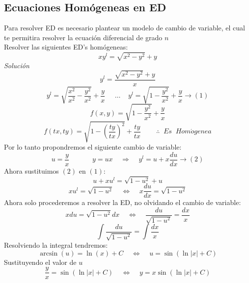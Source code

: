 \documentclass[10pt,executivepaper]{article}
\begin{document}
\subsection{Ecuaciones Homógeneas en ED}
Para resolver ED es necesario plantear un modelo de cambio de variable, el cual te permitira resolver la ecuación diferencial de grado $n$\\
Resolver las siguientes ED's homógeneas:
\[xy^{l}=\sqrt{x^{2}-y^{2}}+y\]
\textit{Solución}
\[y^{l}=\frac{\sqrt{x^{2}-y^{2}}+y}{x}\]
\[y^{l}=\sqrt{\frac{x^{2}}{x^{2}}-\frac{y^{2}}{x^{2}}}+\frac{y}{x}\;\;\;\;\;\ldots\;\;\;\;y^{l}=\sqrt{1-\frac{y^{2}}{x^{2}}}+\frac{y}{x}\rightarrow (1)\]
\[f(x,y)=\sqrt{1-\frac{y^{2}}{x^{2}}}+\frac{y}{x}\]
\[f(tx,ty)=\sqrt{1-\left(\frac{ty}{tx}\right)^{2}}+\frac{ty}{tx}\;\;\;\;\;\;\;\;\therefore\;\;Es\;\;Hom\acute{o}genea\]
Por lo tanto propondremos el siguiente cambio de variable:
\[u=\frac{y}{x}\;\;\;\;\;\;\;\;\;\;\;\;y=ux\;\;\;\;\Rightarrow\;\;\;\;y^{l}=u+x\frac{du}{dx}\rightarrow(2)\]
Ahora sustituimos $(2)$ en $(1)$:
\[u+xu^{l}=\sqrt{1-u^{2}}+u\]
\[xu^{l}=\sqrt{1-u^{2}}\;\;\;\;\Leftrightarrow\;\;\;\;x\frac{du}{dx}=\sqrt{1-u^{2}}\]
Ahora solo procederemos a resolver la ED, no olvidando el cambio de variable:
\[xdu=\sqrt{1-u^{2}}dx\;\;\;\;\Leftrightarrow\;\;\;\;\frac{du}{\sqrt{1-u^{2}}}=\frac{dx}{x}\]
\[\int\frac{du}{\sqrt{1-u^{2}}}=\int\frac{dx}{x}\]
Resolviendo la integral tendremos:
\[\arcsin(u)=\ln(x)+C\;\;\;\;\Leftrightarrow\;\;\;\;u=\sin\left(\ln\left|x\right|+C\right)\]
Sustituyendo el valor de $u$
\[\frac{y}{x}=\sin\left(\ln\left|x\right|+C\right)\;\;\;\;\Leftrightarrow\;\;\;\;y=x\sin\left(\ln\left|x\right|+C\right)\]
\printindex
\end{document}
